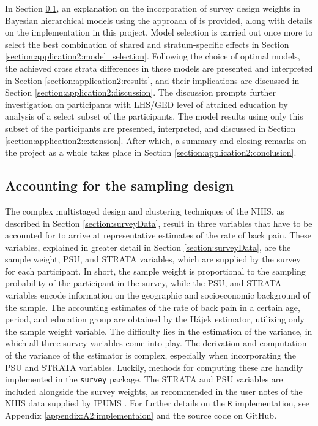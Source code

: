 In Section \ref{section:application2:sampling_design}, an explanation on the incorporation of survey design weights in Bayesian hierarchical models using the approach of \cite{SurveyDesignMercer} is provided, along with details on the implementation in this project. Model selection is carried out once more to select the best combination of shared and stratum-specific effects in Section \ref{section:application2:model_selection}. Following the choice of optimal models, the achieved cross strata differences in these models are presented and interpreted in Section \ref{section:application2:results}, and their implications are discussed in Section \ref{section:application2:discussion}. The discussion prompts further investigation on participants with LHS/GED level of attained education by analysis of a select subset of the participants. The model results using only this subset of the participants are presented, interpreted, and discussed in Section \ref{section:application2:extension}. After which, a summary and closing remarks on the project as a whole takes place in Section \ref{section:application2:conclusion}.

\subsection{Accounting for the sampling design}
\label{section:application2:sampling_design}
The complex multistaged design and clustering techniques of the NHIS, as described in Section \ref{section:surveyData}, result in three variables that have to be accounted for to arrive at representative estimates of the rate of back pain. These variables, explained in greater detail in Section \ref{section:surveyData}, are the sample weight, PSU, and STRATA variables, which are supplied by the survey for each participant. In short, the sample weight is proportional to the sampling probability of the participant in the survey, while the PSU, and STRATA variables encode information on the geographic and socioeconomic background of the sample. The accounting estimates of the rate of back pain in a certain age, period, and education group are obtained by the Hájek estimator, utilizing only the sample weight variable. The difficulty lies in the estimation of the variance, in which all three survey variables come into play. The derivation and computation of the variance of the estimator is complex, especially when incorporating the PSU and STRATA variables. Luckily, methods for computing these are handily implemented in the \texttt{survey} package. The STRATA and PSU variables are included alongside the survey weights, as recommended in the user notes of the NHIS data supplied by IPUMS \citep{IPUMS}. For further details on the \texttt{R} implementation, see Appendix \ref{appendix:A2:implementaion} and the source code on GitHub.


